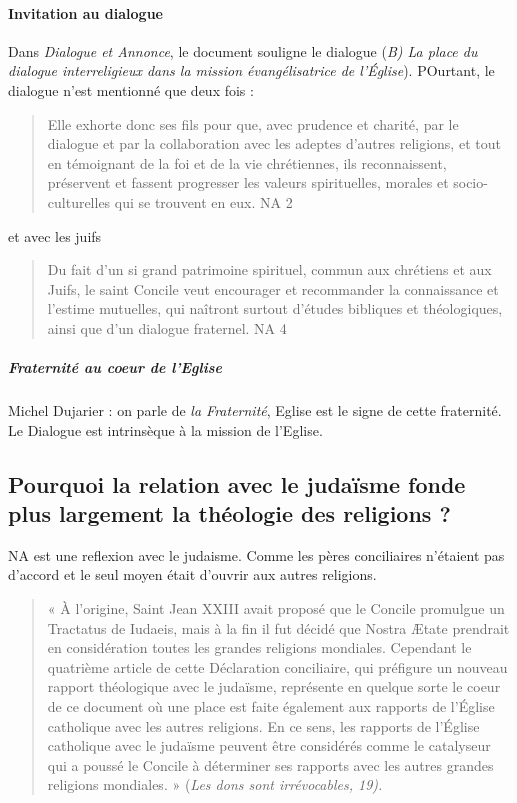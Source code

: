    \paragraph{Invitation au dialogue}
   Dans \textit{Dialogue et Annonce}, le document souligne le dialogue (\textit{B) La place du dialogue interreligieux dans la mission évangélisatrice de l’Église}). POurtant, le dialogue n'est mentionné que deux fois : 
   \begin{quote}
       Elle exhorte donc ses fils pour que, avec prudence et charité, par le dialogue et par la collaboration avec les adeptes d’autres religions, et tout en témoignant de la foi et de la vie chrétiennes, ils reconnaissent, préservent et fassent progresser les valeurs spirituelles, morales et socio-culturelles qui se trouvent en eux.
       NA 2
   \end{quote}
   et avec les juifs
   \begin{quote}
   Du fait d’un si grand patrimoine spirituel, commun aux chrétiens et aux Juifs, le saint Concile veut encourager et recommander la connaissance et l’estime mutuelles, qui naîtront surtout d’études bibliques et théologiques, ainsi que d’un dialogue fraternel.
       NA 4
   \end{quote}
   
   \subparagraph{Fraternité au coeur de l'Eglise}
   Michel Dujarier : on parle de \textit{la Fraternité}, Eglise est le signe de cette fraternité. 
   Le Dialogue est intrinsèque à la mission de l'Eglise. 
   
 \subsection{Pourquoi la relation avec le judaïsme fonde plus largement la théologie des religions ?}
  
  NA est une reflexion avec le judaisme. Comme les pères conciliaires n'étaient pas d'accord et le seul moyen était d'ouvrir aux autres religions.
  
  \begin{quote}
      « À l’origine, Saint Jean XXIII avait proposé que le Concile promulgue un Tractatus de Iudaeis, mais à la fin il fut décidé que Nostra Ætate prendrait en considération toutes les grandes religions mondiales. Cependant le quatrième article de cette Déclaration conciliaire, qui préfigure un nouveau rapport théologique avec le judaïsme, représente en quelque sorte le coeur de ce document où une place est faite également aux rapports de l’Église catholique avec les autres religions. En ce sens, les rapports de l’Église catholique avec le judaïsme peuvent être considérés comme le catalyseur qui a poussé le Concile à déterminer ses rapports avec les autres grandes religions mondiales. » (\textit{Les dons sont irrévocables, 19). } 
  \end{quote}
  
